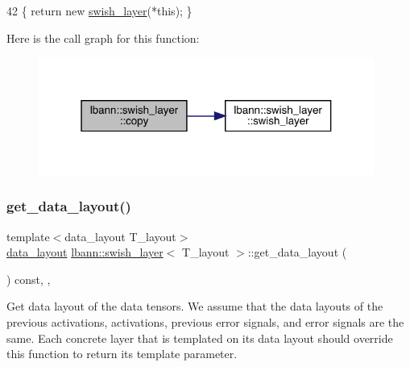 \begin{DoxyCode}
42 \{ \textcolor{keywordflow}{return} \textcolor{keyword}{new} \hyperlink{classlbann_1_1swish__layer_a63d8d4087762ff49954270fde6b03707}{swish\_layer}(*\textcolor{keyword}{this}); \}
\end{DoxyCode}
Here is the call graph for this function\+:\nopagebreak
\begin{figure}[H]
\begin{center}
\leavevmode
\includegraphics[width=313pt]{classlbann_1_1swish__layer_ad88f1660edf910883ab89ef66e4cf14d_cgraph}
\end{center}
\end{figure}
\mbox{\label{classlbann_1_1swish__layer_ac7d29fc0d26bdb58df88e43635141275}} 
\subsubsection{\texorpdfstring{get\+\_\+data\+\_\+layout()}{get\_data\_layout()}}
{\footnotesize\ttfamily template$<$data\+\_\+layout T\+\_\+layout$>$ \\
\hyperlink{base_8hpp_a786677cbfb3f5677b4d84f3056eb08db}{data\+\_\+layout} \hyperlink{classlbann_1_1swish__layer}{lbann\+::swish\+\_\+layer}$<$ T\+\_\+layout $>$\+::get\+\_\+data\+\_\+layout (\begin{DoxyParamCaption}{ }\end{DoxyParamCaption}) const\hspace{0.3cm}{\ttfamily [inline]}, {\ttfamily [override]}, {\ttfamily [virtual]}}

Get data layout of the data tensors. We assume that the data layouts of the previous activations, activations, previous error signals, and error signals are the same. Each concrete layer that is templated on its data layout should override this function to return its template parameter. 

